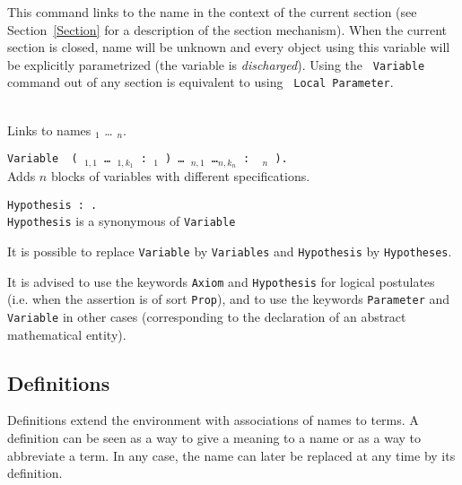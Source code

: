 This command links {\term} to the name {\ident} in the context of the
current section (see Section~\ref{Section} for a description of the section
mechanism). When the current section is closed, name {\ident} will be
unknown and every object using this variable will be explicitly
parametrized (the variable is {\em discharged}). Using the {\tt
Variable} command out of any section is equivalent to using {\tt
Local Parameter}.

\begin{ErrMsgs}
\item {}
\end{ErrMsgs}

\begin{Variants}
\item {}\\
  Links {\term} to names {\ident$_1$} {\ldots} {\ident$_n$}.
\item
 {\tt Variable\,%
(\,{\ident$_{1,1}$} {\ldots} {\ident$_{1,k_1}$}\,{\tt :}\,{\term$_1$} {\tt )}\;%
\ldots\;{\tt (}\,{\ident$_{n,1}$} {\ldots}{\ident$_{n,k_n}$}\,{\tt :}\,%
{\term$_n$} {\tt )}.}\\ 
  Adds $n$ blocks of variables with different specifications.
\item {}
 {\tt Hypothesis {\ident} {\tt :} {\term}.} \\
  \texttt{Hypothesis} is a synonymous of \texttt{Variable}
\end{Variants}

 It is possible to replace {\tt Variable} by
{\tt Variables} and {\tt Hypothesis} by {\tt Hypotheses}.

It is advised to use the keywords \verb:Axiom: and \verb:Hypothesis:
for logical postulates (i.e. when the assertion {\term} is of sort
\verb:Prop:), and to use the keywords \verb:Parameter: and
\verb:Variable: in other cases (corresponding to the declaration of an
abstract mathematical entity).

\subsection{Definitions
\label{Basic-definitions}}

Definitions extend the environment with
associations of names to terms. A definition can be seen as a way to
give a meaning to a name or as a way to abbreviate a term.  In any
case, the name can later be replaced at any time by its definition.

